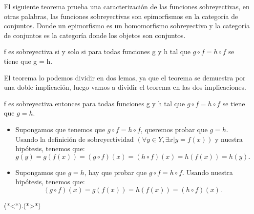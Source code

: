 %
\begin{isabellebody}%
%
%
\isadelimtheory
\isanewline
%
\endisadelimtheory
%
\isatagtheory
%
\endisatagtheory
{\isafoldtheory}%
%
\isadelimtheory
%
\endisadelimtheory
%
\begin{isamarkuptext}%
%
\end{isamarkuptext}\isamarkuptrue%
%
\begin{isamarkuptext}%
%
\end{isamarkuptext}\isamarkuptrue%
%
\begin{isamarkuptext}%
%
\end{isamarkuptext}\isamarkuptrue%
%
\begin{isamarkuptext}%
El siguiente teorema prueba una caracterización de las funciones
 sobreyectivas, en otras palabras, las funciones sobreyectivas son
 epimorfismos en la categoría de conjuntos. Donde un epimorfismo es un
 homomorfismo sobreyectivo y la categoría de conjuntos es la categoría
 donde los objetos son conjuntos.


\begin {teorema}
  f es sobreyectiva si y solo si  para todas funciones g y h tal que 
$g \circ f  = h \circ f$ se tiene que g = h.
\end {teorema}
 
El teorema lo podemos dividir en dos lemas, ya que el teorema se
 demuestra por una doble implicación, luego vamos a dividir el teorema
 en las dos implicaciones.

\begin {lema}
  f es sobreyectiva entonces  para todas funciones g y h tal que 
$g \circ f = h \circ f$ se tiene que $g = h$.
\end {lema}
\begin {demostracion}
\begin {itemize}
\item Supongamos que tenemos que $g \circ  f = h \circ f$, queremos
 probar que $g = h.$ Usando la definición de sobreyectividad
 $(\forall y \in Y,  \exists x | y = f(x))$ y nuestra hipótesis,
 tenemos que: $$g(y) = g(f(x)) = (g \circ f) (x) = (h \circ f) (x) =
 h(f(x)) = h(y).$$
\item Supongamos que $g = h$, hay que probar que
 $g \circ f = h \circ f.$ Usando nuestra hipótesis, tenemos que:
$$ (g \circ f)(x) = g(f(x)) = h(f(x)) = (h \circ f) (x).$$
\end {itemize}
(*<*).(*>*)
\end {demostracion}


\end{isamarkuptext}
\end{isabellebody}
